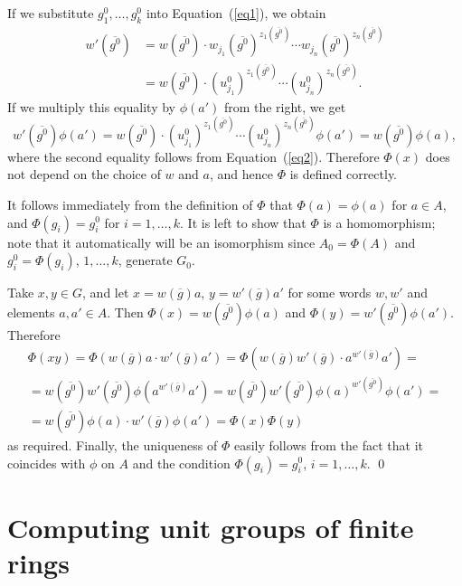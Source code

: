 \documentclass{article}
\begin{document}
If we substitute \( g^0_1, \dots, g^0_k \) into Equation~(\ref{eq1}), we obtain
\begin{align*}
	w'(\overline{g^0}) &= w(\overline{g^0}) \cdot w_{j_1}(\overline{g^0})^{z_1(\overline{g^0})} \cdots w_{j_n}(\overline{g^0})^{z_n(\overline{g^0})}\\
			&= w(\overline{g^0}) \cdot (u^0_{j_1})^{z_1(\overline{g^0})} \cdots (u^0_{j_n})^{z_n(\overline{g^0})}.
\end{align*}
If we multiply this equality by \( \phi(a') \) from the right, we get
\[ w'(\overline{g^0})\phi(a') = w(\overline{g^0}) \cdot (u^0_{j_1})^{z_1(\overline{g^0})} \cdots (u^0_{j_n})^{z_n(\overline{g^0})}\phi(a') = w(\overline{g^0})\phi(a), \]
where the second equality follows from Equation~(\ref{eq2}).
Therefore \( \Phi(x) \) does not depend on the choice of \( w \) and \( a \), and hence \( \Phi \) is defined correctly.

It follows immediately from the definition of \( \Phi \) that \( \Phi(a) = \phi(a) \) for \( a \in A \), and \( \Phi(g_i) = g^0_i \) for \( i = 1, \dots, k \).
It is left to show that \( \Phi \) is a homomorphism; note that it automatically will be an isomorphism since \( A_0 = \Phi(A) \) and \( g^0_i = \Phi(g_i) \),
\( 1, \dots, k \), generate \( G_0 \).

Take \( x, y \in G \), and let \( x = w(\overline{g})a \), \( y = w'(\overline{g})a' \) for some words \( w, w' \) and elements \( a, a' \in A \).
Then \( \Phi(x) = w(\overline{g^0})\phi(a) \) and \( \Phi(y) = w'(\overline{g^0})\phi(a') \). Therefore
\begin{multline*}
	\Phi(xy) = \Phi(w(\overline{g})a \cdot w'(\overline{g})a') = \Phi(w(\overline{g})w'(\overline{g}) \cdot a^{w'(\overline{g})}a') = \\
	= w(\overline{g^0})w'(\overline{g^0}) \phi(a^{w'(\overline{g})}a') = w(\overline{g^0})w'(\overline{g^0}) \phi(a)^{w'(\overline{g^0})}\phi(a') = \\
	= w(\overline{g^0})\phi(a) \cdot w'(\overline{g})\phi(a') = \Phi(x)\Phi(y)
\end{multline*}
as required. Finally, the uniqueness of \( \Phi \) easily follows from the fact that it coincides with \( \phi \) on \( A \)
and the condition \( \Phi(g_i) = g^0_i \), \( i = 1, \dots, k \). \qed

\section{Computing unit groups of finite rings}\label{sunits}
\end{document}

